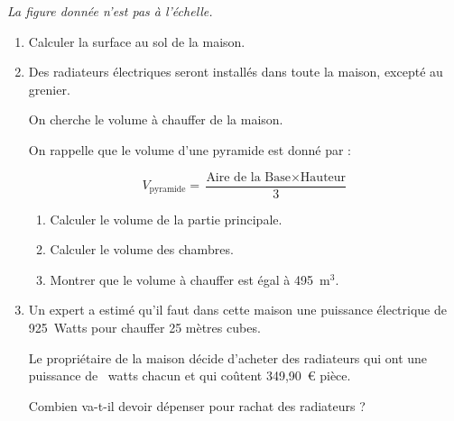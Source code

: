 \emph{La figure donnée n'est pas à l'échelle.}

\medskip

\begin{enumerate}
\item Calculer la surface au sol de la maison.
\item Des radiateurs électriques seront installés dans toute la maison, excepté au
grenier.

On cherche le volume à chauffer de la maison.

On rappelle que le volume d'une pyramide est donné par :

\[V_{\text{pyramide}} = \dfrac{\text{Aire de la Base} \times \text{Hauteur}}{3}\]

	\begin{enumerate}
		\item Calculer le volume de la partie principale.
		\item Calculer le volume des chambres.
		\item Montrer que le volume à chauffer est égal à 495~m$^3$.
	\end{enumerate}
\item  Un expert a estimé qu'il faut dans cette maison une puissance électrique de
925~Watts pour chauffer 25 mètres cubes.
	
Le propriétaire de la maison décide d'acheter des radiateurs qui ont une puissance
de ~watts chacun et qui coûtent 349,90~\euro{} pièce.
	
Combien va-t-il devoir dépenser pour rachat des radiateurs ?
\end{enumerate} 
